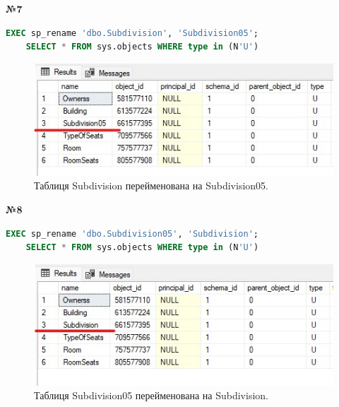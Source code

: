 \documentclass[a4paper,12pt]{article}
\begin{document}
\newpage
	\begin{center}
		\textbf{№7}
	\end{center}
	\begin{lstlisting}[language=SQL]
	EXEC sp_rename 'dbo.Subdivision', 'Subdivision05';
	SELECT * FROM sys.objects WHERE type in (N'U')
	\end{lstlisting}
	\begin{figure}[h!]
		\centering
		\begin{minipage}[h]{0.8\linewidth}
			\includegraphics[width=1\linewidth]{Prt sc/Figure_7.jpg}  
		\end{minipage}
		\caption{Таблиця Subdivision перейменована на Subdivision05.}
	\end{figure}
	\begin{center}
		\textbf{№8}
	\end{center}
	\begin{lstlisting}[language=SQL]
	EXEC sp_rename 'dbo.Subdivision05', 'Subdivision';
	SELECT * FROM sys.objects WHERE type in (N'U')
	\end{lstlisting}
	\begin{figure}[h!]
		\centering
		\begin{minipage}[h]{0.8\linewidth}
			\includegraphics[width=1\linewidth]{Prt sc/Figure_8.jpg}  
		\end{minipage}
		\caption{Таблиця Subdivision05 перейменована на Subdivision.}
	\end{figure}
	
\end{document}
